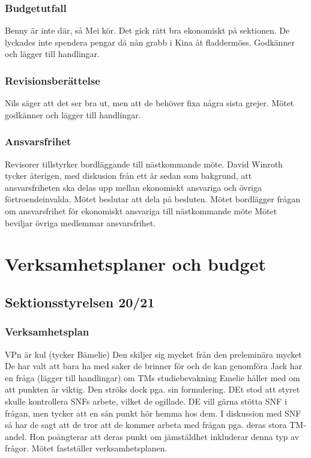 \documentclass[hidelinks]{sektionsmote}
\begin{document}
\subsubsection{Budgetutfall}
Benny är inte där, så Mei kör.
Det gick rätt bra ekonomiskt på sektionen.
De lyckades inte spendera pengar då nån grabb i Kina åt fladdermöss.
Godkänner och lägger till handlingar.

\subsubsection{Revisionsberättelse}
Nils säger att det ser bra ut, men att de behöver fixa några sista grejer.
Mötet godkänner och lägger till handlingar.

\subsubsection{Ansvarsfrihet}
Revisorer tillstyrker bordläggande till nästkommande möte.
David Winroth tycker återigen, med diskusion från ett år sedan som bakgrund, att ansvarsfriheten ska delas upp mellan ekonomiskt ansvariga och övriga förtroendeinvalda.
Mötet beslutar att dela på besluten.
Mötet bordlägger frågan om ansvarsfrihet för ekonomiskt ansvariga till nästkommande möte
Mötet beviljar övriga medlemmar ansvarsfrihet.


\section{Verksamhetsplaner och budget}

\subsection{Sektionsstyrelsen 20/21}

\subsubsection{Verksamhetsplan}
VPn är kul (tycker Bämelie)
Den skiljer sig mycket från den preleminära mycket
De har valt att bara ha med saker de brinner för och de kan genomföra
Jack har en fråga (lägger till handlingar) om TMs studiebevakning
Emelie håller med om att punkten är viktig. Den ströks dock pga. sin formulering. DEt stod att styret skulle kontrollera SNFs arbete, vilket de ogillade. DE vill gärna stötta SNF i frågan, men tycker att en sån punkt hör hemma hos dem.
I diskussion med SNF så har de sagt att de tror att de kommer arbeta med frågan pga. deras stora TM-andel.
Hon poängterar att deras punkt om jämstäldhet inkluderar denna typ av frågor.
Mötet fastställer verksamhetsplanen.
\end{document}
